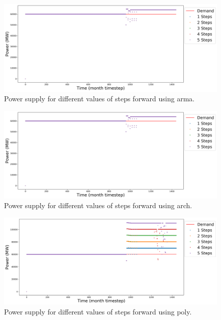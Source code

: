 \documentclass[11pt]{article}
\begin{document}
\begin{figure}[!h]
	\centering
	\includegraphics[width=\textwidth]{29-figures/29-power-buffer0-arma-steps.png} 
	\hfill
	\caption{Power supply for different values of steps forward using arma.}
	\label{fig:29-ste-arma}
\end{figure}

\begin{figure}[!h]
	\centering
	\includegraphics[width=\textwidth]{29-figures/29-power-buffer0-arch-steps.png} 
	\hfill
	\caption{Power supply for different values of steps forward using arch.}
	\label{fig:29-ste-arch}
\end{figure}

\begin{figure}[!h]
	\centering
	\includegraphics[width=\textwidth]{29-figures/29-power-buffer0-poly-steps.png} 
	\hfill
	\caption{Power supply for different values of steps forward using poly.}
	\label{fig:29-ste-poly}
\end{figure}
\end{document}
